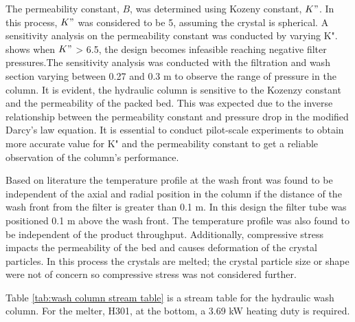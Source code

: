 The permeability constant, $B$, was determined using Kozeny constant, $K"$.  In this process, $K"$ was considered to be 5, assuming the crystal is spherical. A sensitivity analysis on the permeability constant was conducted by varying K".  shows when $K"$ > 6.5, the design becomes infeasible reaching negative filter pressures.The sensitivity analysis was conducted with the filtration and wash section varying between 0.27 and 0.3 m to observe the range of pressure in the column. It is evident, the hydraulic column is sensitive to the Kozenzy constant and the permeability of the packed bed. This was expected due to the inverse relationship between the permeability constant and pressure drop in the modified Darcy's law equation. It is essential to conduct pilot-scale experiments to obtain more accurate value for K" and the permeability constant to get a reliable observation of the column's performance. 

Based on literature \cite{jansens_furification_1995} the temperature profile at the wash front was found to be independent of the axial and radial position in the column if the distance of the wash front from the filter is greater than 0.1 m. In this design the filter tube was positioned 0.1 m above the wash front. The temperature profile was also found to be independent of the product throughput. Additionally, compressive stress impacts the permeability of the bed and causes deformation of the crystal particles. In this process the crystals are melted; the crystal particle size or shape were not of concern so compressive stress was not considered further. 

Table \ref{tab:wash column stream table} is a stream table for the hydraulic wash column. For the melter, H301, at the bottom, a 3.69 kW heating duty is required.  

